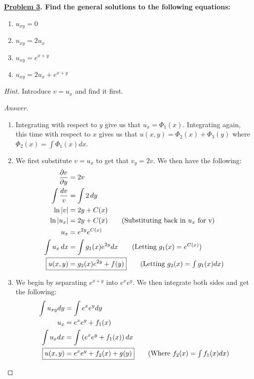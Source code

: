 \documentclass{article}
\theoremstyle{definition}
\renewcommand\qedsymbol{$\blacksquare$}
\newenvironment{ans}{\begin{proof}[Answer]\renewcommand{\qedsymbol}{}}{\end{proof}}
\newenvironment{boldenv}{\bfseries\boldmath}{}
\begin{document}
	\begin{boldenv}
		\underline{Problem 3}. Find the general solutions to the following equations:
		\begin{enumerate}[resume*=problems]
			\item $u_{xy} = 0$
			\item $u_{xy} = 2u_x$
			\item $u_{xy} = e^{x+y}$
			\item $u_{xy} = 2u_x + e^{x+y}$
		\end{enumerate}
		\textit{Hint.} Introduce $v=u_x$ and find it first.
	\end{boldenv}
	
	\begin{ans}
		\begin{enumerate}[resume*=answers]
			\item Integrating with respect to $y$ give us that $u_x = \Phi_1(x)$. Integrating again, this time with respect to $x$ gives us that $\boxed{u(x,y) = \Phi_2(x) + \Phi_3(y)}$ where $\Phi_2(x) = \int \Phi_1(x)dx$.
			
			\item We first substitute $v=u_x$ to get that $v_y = 2v$. We then have the following:
			\begin{align*}
				\frac{\partial v}{\partial y} &= 2v\\
				\int\frac{dv}{v} &= \int2\, d y\\
				\ln{|v|} &= 2y + C(x)\\
				\ln{|u_x|} &= 2y + C(x) \tag{Substituting back in $u_x$ for v}\\
				u_x &= e^{2y}e^{C(x)}\\
				\int u_x\,dx &= \int g_1(x)e^{2y}dx \tag{Letting $g_1(x) = e^{C(x)}$}\\
				\Aboxed{u(x,y) &= g_2(x)e^{2y} + f(y)} \tag{Letting $g_2(x) = \int g_1(x)dx$}
			\end{align*}
			
			\item We begin by separating $e^{x+y}$ into $e^xe^y$. We then integrate both sides and get the following:
			\begin{align*}
				\int u_{xy}dy &= \int e^xe^y dy \\
				u_x &= e^xe^y + f_1(x)\\
				\int u_xdx &= \int\left(e^xe^y + f_1(x)\right)dx\\
				\Aboxed{u(x,y) &= e^xe^y + f_2(x) + g(y)} \tag{Where $f_2(x) = \int f_1(x)dx$}
			\end{align*}
			

\end{enumerate}
\end{ans}
\end{document}
